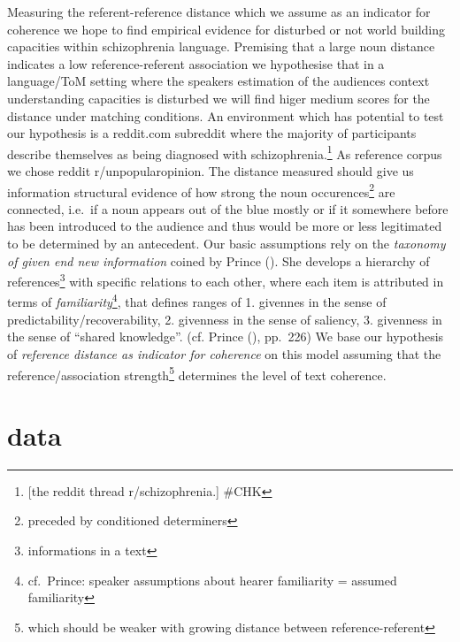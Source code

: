 \documentclass[
  12pt,
  oneside]{book}
\begin{document}
Measuring the referent-reference distance which we assume as an indicator for coherence we hope to find empirical evidence for disturbed or not world building capacities within schizophrenia language. Premising that a large noun distance indicates a low reference-referent association we hypothesise that in a language/ToM setting where the speakers estimation of the audiences context understanding capacities is disturbed we will find higer medium scores for the distance under matching conditions. An environment which has potential to test our hypothesis is a reddit.com subreddit where the majority of participants describe themselves as being diagnosed with schizophrenia.\footnote{{[}the reddit thread r/schizophrenia.{]} \#CHK} As reference corpus we chose reddit r/unpopularopinion.
The distance measured should give us information structural evidence of how strong the noun occurences\footnote{preceded by conditioned determiners} are connected, i.e.~if a noun appears out of the blue mostly or if it somewhere before has been introduced to the audience and thus would be more or less legitimated to be determined by an antecedent.
Our basic assumptions rely on the \emph{taxonomy of given end new information} coined by Prince (). She develops a hierarchy of references\footnote{informations in a text} with specific relations to each other, where each item is attributed in terms of \emph{familiarity}\footnote{cf.~Prince: speaker assumptions about hearer familiarity = assumed familiarity}, that defines ranges of 1. givennes in the sense of predictability/recoverability, 2. givenness in the sense of saliency, 3. givenness in the sense of ``shared knowledge''. (cf. Prince (), pp.~226) We base our hypothesis of \emph{reference distance as indicator for coherence} on this model assuming that the reference/association strength\footnote{which should be weaker with growing distance between reference-referent} determines the level of text coherence.

\section{data}\label{data}
\end{document}
